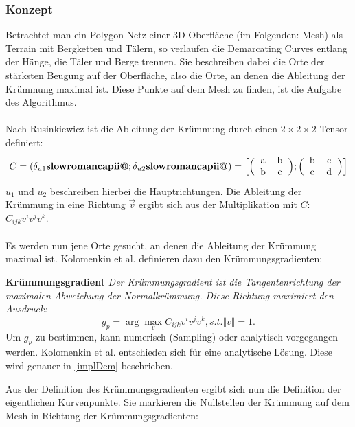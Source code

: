 \documentclass{paperStyle}
\makeatletter
\newcommand{\Rmnum}[1]{\textbf{\expandafter\@slowromancap\romannumeral #1@}}
\makeatother
\begin{document}
\subsubsection{Konzept}
\label{defdem}
Betrachtet man ein Polygon-Netz einer 3D-Oberfläche (im Folgenden: Mesh) als Terrain mit Bergketten und Tälern, so verlaufen die Demarcating Curves entlang der Hänge, die Täler und Berge trennen. Sie beschreiben dabei die Orte der stärksten Beugung auf der Oberfläche, also die Orte, an denen die Ableitung der Krümmung maximal ist. Diese Punkte auf dem Mesh zu finden, ist die Aufgabe des Algorithmus.  
\\\\
Nach Rusinkiewicz \cite{CurvDeriv2004} ist die Ableitung der Krümmung durch einen $2 \times 2 \times 2$ Tensor definiert:
\begin{equation}
\label{eq:rusin}
	C = (\delta_{u1}\Rmnum{2};\delta_{u2}\Rmnum{2}) = \Big[ \Big(
	\begin{tabular}{cc}
	 a & b \\
	 b & c
	\end{tabular}\Big)
	;
	\Big(
	\begin{tabular}{cc}
	b & c \\
	c & d
	\end{tabular}
	\Big)
	\Big]
\end{equation}
$u_1$ und $u_2$ beschreiben hierbei die Hauptrichtungen. Die Ableitung der Krümmung in eine Richtung $\vec{v}$ ergibt sich aus der Multiplikation mit $C$:
$
C_{ijk} v^i v^j v^k
$.\\
\\
 Es werden nun jene Orte gesucht, an denen die Ableitung der Krümmung maximal ist. Kolomenkin et al. \cite{Demarcating} definieren dazu den Krümmungsgradienten: 
 
\textbf{Krümmungsgradient}
\emph{Der Krümmungsgradient ist die Tangentenrichtung der maximalen Abweichung der Normalkrümmung. Diese Richtung maximiert den Ausdruck: }
\begin{equation}
\label{eq:gp}
g_p= \arg\max_v C_{ijk}v^{i}v^{j}v^{k}, s.t. \Vert v\Vert = 1.
\end{equation}
Um $g_p$ zu bestimmen, kann numerisch (Sampling) oder analytisch vorgegangen werden. Kolomenkin et al. entschieden sich für eine analytische Lösung. Diese wird genauer in \ref{implDem} beschrieben. 

Aus der Definition des Krümmungsgradienten ergibt sich nun die Definition der eigentlichen Kurvenpunkte. Sie markieren die Nullstellen der Krümmung auf dem Mesh in Richtung der Krümmungsgradienten:
\end{document}
